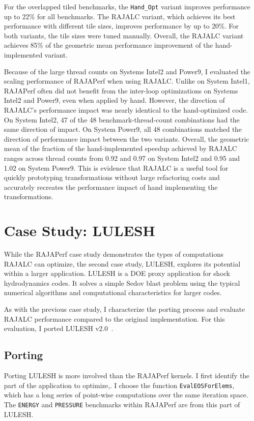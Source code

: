 For the overlapped tiled benchmarks, the \verb.Hand_Opt. variant improves
performance up to 22\% for all benchmarks.
The RAJALC variant, which achieves its best performance with different tile sizes, improves performance by 
up to 20\%.
For both variants, the tile sizes were tuned manually.
Overall, the RAJALC variant achieves 85\% of the geometric mean performance
improvement of the hand-implemented variant. 


Because of the large thread counts on Systems Intel2 and Power9, I evaluated the scaling performance of RAJAPerf when using RAJALC\@.
Unlike on System Intel1, RAJAPerf often did not benefit from the inter-loop
optimizations on Systems Intel2 and Power9, even when applied by hand. 
However, the direction of RAJALC's performance impact was nearly identical to the hand-optimized code. 
On System Intel2, 47 of the 48 benchmark-thread-count combinations had the same direction of impact.
On System Power9, all 48 combinations matched the direction of performance impact between the two variants.
Overall, the geometric mean of the fraction of the hand-implemented speedup achieved by RAJALC ranges across thread counts from 0.92 and 0.97 on System Intel2 and 0.95 and 1.02 on System Power9. 
This is evidence that RAJALC is a useful tool for quickly prototyping transformations without large refactoring costs and accurately recreates the performance impact of hand implementing the transformations.

\section{Case Study: LULESH}

While the RAJAPerf case study demonstrates the types of computations RAJALC
can optimize, the second case study, LULESH, explores its potential within a
larger application.
LULESH is a DOE proxy application for shock hydrodynamics codes.
It solves a simple Sedov blast problem using the typical numerical algorithms and computational characteristics for larger codes.

As with the previous case study, I characterize the porting process and
evaluate RAJALC performance compared to the original implementation.
For this evaluation, I ported LULESH v2.0~\cite{LULESH2}. 

\subsection{Porting}

Porting LULESH is more involved than the RAJAPerf kernels. 
I first identify the part of the application to optimize,.
I choose the function \verb.EvalEOSForElems., which has a long series
of point-wise computations over the same iteration space.
The \verb.ENERGY. and \verb.PRESSURE. benchmarks within RAJAPerf are
from this part of LULESH\@.

